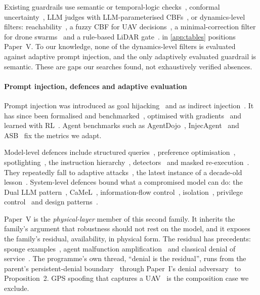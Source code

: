 Existing guardrails use semantic or temporal-logic
checks~\cite{yang2024safetychip,ravichandran2026roboguard}, conformal
uncertainty~\cite{ren2023knowno}, LLM judges with LLM-parameterised
CBFs~\cite{khan2025safer}, or dynamics-level filters:
reachability~\cite{hafez2025reachllm,lin2025sandra}, a fuzzy CBF for UAV
decisions~\cite{zhao2026sagellm}, a minimal-correction filter for drone
swarms~\cite{schuck2025swarmgpt} and a rule-based LiDAR
gate~\cite{zhang2025unified}.
 in \cref{app:tables} positions Paper~V. To our knowledge, none of the
dynamics-level filters is evaluated against adaptive prompt injection, and
the only adaptively evaluated guardrail is semantic. These are gaps our
searches found, not exhaustively verified absences.



\paragraph{Prompt injection, defences and adaptive evaluation} Prompt
injection was introduced as goal hijacking~\cite{perez2022ignore} and as
indirect injection~\cite{greshake2023injection}. It has since been
formalised and benchmarked~\cite{liu2024formalizing,liu2023houyi}, optimised
with gradients~\cite{zou2023universal} and learned with
RL~\cite{wen2025rlhammer}. Agent benchmarks such as
AgentDojo~\cite{debenedetti2024agentdojo}, InjecAgent~\cite{zhan2024injecagent}
and ASB~\cite{zhang2025asb} fix the metrics we adapt.

Model-level defences include structured queries~\cite{chen2025struq},
preference optimisation~\cite{chen2025secalign},
spotlighting~\cite{hines2024spotlighting}, the instruction
hierarchy~\cite{wallace2024hierarchy}, detectors~\cite{liu2025datasentinel}
and masked re-execution~\cite{zhu2025melon}. They repeatedly fall to adaptive
attacks~\cite{zhan2025adaptive,nasr2026attacker}, the latest instance of a
decade-old lesson~\cite{carlini2017towards,athalye2018obfuscated,carlini2019evaluating,tramer2020adaptive}.
System-level defences bound what a compromised model can do: the Dual LLM
pattern~\cite{willison2023dualllm}, CaMeL~\cite{debenedetti2025camel},
information-flow control~\cite{costa2025fides},
isolation~\cite{wu2025isolategpt}, privilege control~\cite{shi2025progent} and
design patterns~\cite{beurerkellner2025patterns}.

Paper~V is the \emph{physical-layer} member of this second family. It
inherits the family's argument that robustness should not rest on the model,
and it exposes the family's residual, availability, in physical form. The
residual has precedents: sponge examples~\cite{shumailov2021sponge}, agent
malfunction amplification~\cite{zhang2024breakingagents} and classical
denial of service~\cite{gligor1984dos}. The programme's own thread, ``denial
is the residual'', runs from the parent's persistent-denial
boundary~\cite{parentpaper} through Paper~I's denial
adversary~\cite{paperI} to Proposition~2. GPS spoofing that captures a
UAV~\cite{kerns2014gps} is the composition case we exclude.

